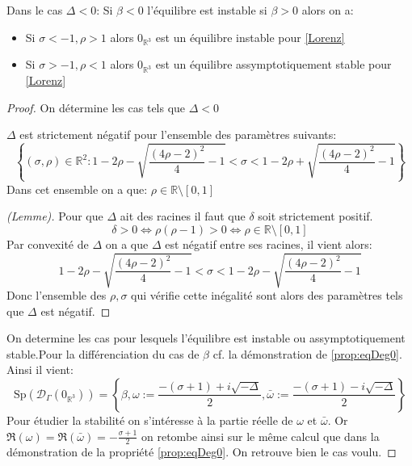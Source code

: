 \documentclass{article}
\newcommand{\R}{\mathbb{R}}
\newtheorem[M , nocut]{prop}{Proposition}[section]
\newtheorem[S , nocut]{definition}{Définition}
\newtheorem[S , nocut]{lemme}{Lemme}
\newtheorem[L , nocut]{thm}{Théoreme}
\newtheorem[L , nocut]{cor}{Corollaire}
\begin{document}
\begin{prop}
    Dans le cas $\Delta<0$:
    Si $\beta <0$ l'équilibre est instable si $\beta>0$ alors on a:
    \begin{itemize}
        \item Si $\sigma < -1 , \rho > 1$ alors $0_{\R^3}$ est un équilibre instable pour \eqref{Lorenz}
        \item Si $\sigma > -1 , \rho < 1$ alors $0_{\R^3}$ est un équilibre assymptotiquement stable pour \eqref{Lorenz}
    \end{itemize}
\end{prop}
\begin{proof}
    On détermine les cas tels que $\Delta<0$
    \begin{lemme}
        $\Delta$ est strictement négatif pour l'ensemble des paramètres suivants:
        \[
        \left\{(\sigma,\rho)\in \R ^2 : 1-2 \rho - \sqrt{ \frac{(4\rho-2)^2}{4} -1 }< \sigma < 1-2 \rho + \sqrt{ \frac{(4\rho-2)^2}{4} -1 } \right\}    
        \]Dans cet ensemble on a que: $\rho \in \R \setminus [0,1]$ 
    \end{lemme}

    \begin{proof}[(Lemme)]
     Pour que $\Delta$ ait des racines il faut que $\delta$ soit strictement positif.
    \[
    \delta > 0 \Leftrightarrow \rho(\rho-1) > 0 \Leftrightarrow \rho \in \R \setminus [0,1]
    \]Par convexité de $\Delta$ on a que $\Delta$ est négatif entre ses racines, il vient alors:
    \[
        1-2 \rho - \sqrt{ \frac{(4\rho-2)^2}{4} -1 } < \sigma < 1-2 \rho - \sqrt{ \frac{(4\rho-2)^2}{4} -1 }
    \]Donc l'ensemble des $\rho,\sigma$ qui vérifie cette inégalité sont alors des paramètres tels que $\Delta$ est négatif.
    \end{proof}

    On determine les cas pour lesquels l'équilibre est instable ou assymptotiquement stable.Pour la différenciation du cas de $\beta$ cf. la démonstration de \ref{prop:eqDeg0}. Ainsi il vient:
    \[
        \mathrm{Sp}(\mathcal{D}_\Gamma (0_{\R^3})) = \left\{\beta, \omega := \frac{-(\sigma+1)+ i \sqrt{-\Delta}}{2}, \bar{\omega} := \frac{-(\sigma+1)- i \sqrt{-\Delta}}{2}\right\}
    \]Pour étudier la stabilité on s'intéresse à la partie réelle de $\omega$ et $\bar{\omega}$. Or $\Re (\omega) = \Re (\bar{\omega}) = -\frac{\sigma+1}{2}$ on retombe ainsi sur le même calcul que dans la démonstration de la propriété \ref{prop:eqDeg0}. On retrouve bien le cas voulu.
\end{proof}
\end{document}
